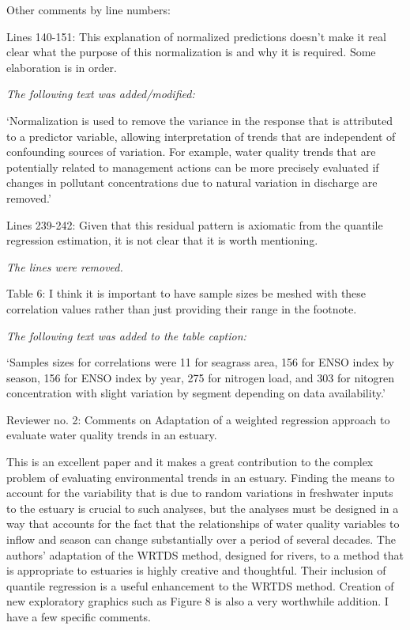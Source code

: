 \documentclass[letterpaper,12pt,oneside]{article}\usepackage[]{graphicx}\usepackage[]{color}
\begin{document}
Other comments by line numbers:

Lines 140-151:  This explanation of normalized predictions doesn't make it real clear what the purpose of this normalization is and why it is required.  Some elaboration is in order. 

{\it The following text was added/modified: 

`Normalization is used to remove the variance in the response that is attributed to a predictor variable, allowing interpretation of trends that are independent of confounding sources of variation. For example, water quality trends that are potentially related to management actions can be more precisely evaluated if changes in pollutant concentrations due to natural variation in discharge are removed.'}

Lines 239-242:  Given that this residual pattern is axiomatic from the quantile regression estimation, it is not clear that it is worth mentioning. 

{\it The lines were removed.}

Table 6:  I think it is important to have sample sizes be meshed with these correlation values rather than just providing their range in the footnote.

{\it The following text was added to the table caption:

`Samples sizes for correlations were 11 for seagrass area, 156 for ENSO index by season, 156 for ENSO index by year, 275 for nitrogen load, and 303 for nitogren concentration with slight variation by segment depending on data availability.'}
 

Reviewer no. 2: Comments on Adaptation of a weighted regression approach to evaluate water quality trends in an estuary.

This is an excellent paper and it makes a great contribution to the complex problem of evaluating environmental trends in an estuary.  Finding the means to account for the variability that is due to random variations in freshwater inputs to the estuary is crucial to such analyses, but the analyses must be designed in a way that accounts for the fact that the relationships of water quality variables to inflow and season can change substantially over a period of several decades.  The authors' adaptation of the WRTDS method, designed for rivers, to a method that is appropriate to estuaries is highly creative and thoughtful.  Their inclusion of quantile regression is a useful enhancement to the WRTDS method.  Creation of new exploratory graphics such as Figure 8 is also a very worthwhile addition.  I have a few specific comments.
\end{document}
